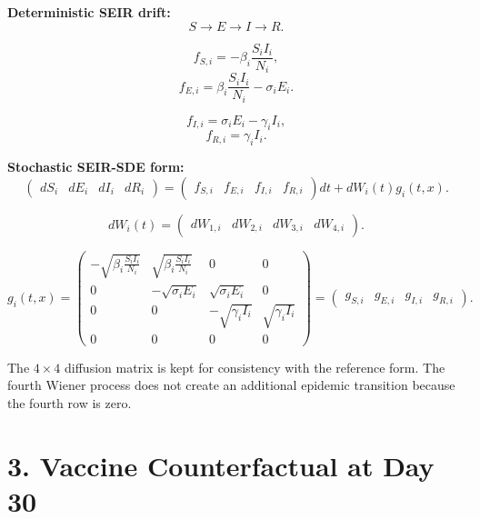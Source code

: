 \documentclass[15pt]{extarticle}
\begin{document}
\textbf{Deterministic SEIR drift:}
\[
S \rightarrow E \rightarrow I \rightarrow R.
\]

\vspace{0.10cm}

\begin{minipage}[t]{0.47\textwidth}
\[
f_{S,i}= -\beta_i \frac{S_i I_i}{N_i},
\]
\[
f_{E,i}= \beta_i \frac{S_i I_i}{N_i}-\sigma_i E_i.
\]
\end{minipage}
\hfill
\begin{minipage}[t]{0.47\textwidth}
\[
f_{I,i}= \sigma_i E_i-\gamma_i I_i,
\]
\[
f_{R,i}= \gamma_i I_i.
\]
\end{minipage}

\vspace{0.18cm}

\textbf{Stochastic SEIR-SDE form:}
\[
\begin{pmatrix}
dS_i & dE_i & dI_i & dR_i
\end{pmatrix}
=
\begin{pmatrix}
f_{S,i} & f_{E,i} & f_{I,i} & f_{R,i}
\end{pmatrix}dt
+
dW_i(t)g_i(t,x).
\]

\[
dW_i(t)=
\begin{pmatrix}
dW_{1,i} & dW_{2,i} & dW_{3,i} & dW_{4,i}
\end{pmatrix}.
\]

\vspace{0.08cm}

\[
g_i(t,x)=
\begin{pmatrix}
-\sqrt{\beta_i \frac{S_i I_i}{N_i}}
& \sqrt{\beta_i \frac{S_i I_i}{N_i}}
& 0
& 0 \\[4pt]
0
& -\sqrt{\sigma_i E_i}
& \sqrt{\sigma_i E_i}
& 0 \\[4pt]
0
& 0
& -\sqrt{\gamma_i I_i}
& \sqrt{\gamma_i I_i} \\[4pt]
0
& 0
& 0
& 0
\end{pmatrix}
=
\begin{pmatrix}
g_{S,i} & g_{E,i} & g_{I,i} & g_{R,i}
\end{pmatrix}.
\]

\begin{tcolorbox}
The \(4\times4\) diffusion matrix is kept for consistency with the reference form. The fourth Wiener process does not create an additional epidemic transition because the fourth row is zero.
\end{tcolorbox}


\newpage
\section*{3. Vaccine Counterfactual at Day 30}
\end{document}
